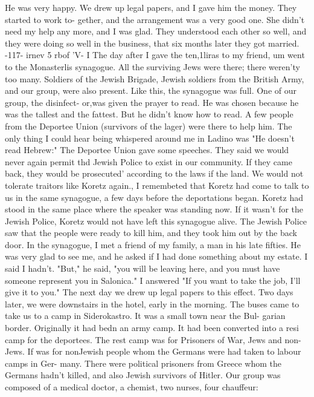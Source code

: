 He was very happy.
We drew up legal papers, and I gave him the money.
They started to work to-
gether, and the arrangement was a very good one.
She didn't need my help any more, 
and I was glad.
They understood each other so well, and they were doing so well in 
the business, that six months later they got married.
-117- 
irnev 5 rbof 'V- I 
The day after I gave the ten,1liras to my friend, um went to the Monasterlis 
synagogue.
All the surviving Jews were there; there weren'ty too many.
Soldiers 
of the Jewish Brigade, Jewish soldiers from the British Army, and our group, were 
also present.
Like this, the synagogue was full.
One of our group, the disinfect-
or,was given the prayer to read.
He was chosen because he was the tallest and the 
fattest.
But he didn't know how to read.
A few people from the Deportee Union 
(survivors of the lager) were there to help him.
The only thing I could hear being 
whispered around me in Ladino was "He doesn't read Hebrew:" 
The Deportee Union gave some speeches.
They said we would never again permit thd 
Jewish Police to exist in our community.
If they came back, they would be prosecuted' 
according to the laws if the land.
We would not tolerate traitors like Koretz again., 
I remembeted that Koretz had come to talk to us in the same synagogue, a few days 
before the deportations began.
Koretz had stood in the same place where the speaker 
was standing now.
If it wasn't for the Jewish Police, Koretz would not have left 
this synagogue alive.
The Jewish Police saw that the people were ready to kill him, 
and they took him out by the back door.
In the synagogue, I met a friend of my family, a man in his late fifties.
He 
was very glad to see me, and he asked if I had done something about my estate.
I 
said I hadn't.
"But," he said, "you will be leaving here, and you must have someone 
represent you in Salonica."
I answered "If you want to take the job, I'll give it 
to you."
The next day we drew up legal papers to this effect.
Two days later, we were downstairs in the hotel, early in the morning.
The 
buses came to take us to a camp in Siderokastro.
It was a small town near the Bul-
garian border.
Originally it had bedn an army camp.
It had been converted into a resi 
camp for the deportees.
The rest camp was for Prisoners of War, Jews and non-Jews.
If was for nonJewish people whom the Germans were had taken to labour camps in Ger-
many.
There were political prisoners from Greece whom the Germans hadn't killed, and 
also Jewish survivors of Hitler.
Our group was composed of a medical doctor, a chemist, two nurses, four chauffeur: 
